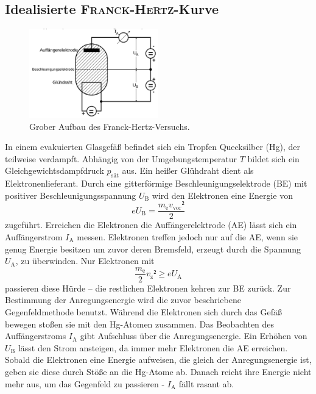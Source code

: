 \subsection{Idealisierte \textsc{Franck}-\textsc{Hertz}-Kurve}
\begin{figure}
	\centering
	\includegraphics[width=0.5\textwidth]{Bilder/Aufbau.pdf}
	\caption{Grober Aufbau des Franck-Hertz-Versuchs.}
\end{figure}
In einem evakuierten Glasgefäß befindet sich ein Tropfen Quecksilber (Hg), der teilweise verdampft. 
Abhängig von der Umgebungstemperatur $T$ bildet sich ein Gleichgewichtsdampfdruck $p_\mathup{sät}$ aus. 
Ein heißer Glühdraht dient als Elektronenlieferant.
Durch eine gitterförmige Beschleunigungselektrode (BE) mit positiver Beschleunigungsspannung $U_\mathup{B}$ wird den Elektronen eine Energie von 
\begin{equation}
	e U_\mathup{B}=\frac{m_\mathup{e}v_\mathup{vor}²}{2}
\end{equation}
zugeführt. 
Erreichen die Elektronen die Auffängerelektrode (AE) lässt sich ein Auffängerstrom $I_\mathup{A}$ messen. 
Elektronen treffen jedoch nur auf die AE, wenn sie genug Energie besitzen um zuvor deren Bremsfeld, erzeugt durch die Spannung $U_\mathup{A}$, zu überwinden. 
Nur Elektronen mit 
\begin{equation}
	\frac{m_\mathup{e}}{2}v_\mathup{z}² \geq e U_\mathup{A}
\end{equation}
passieren diese Hürde -- die restlichen Elektronen kehren zur BE zurück.
Zur Bestimmung der Anregungsenergie wird die zuvor beschriebene Gegenfeldmethode benutzt. 
Während die Elektronen sich durch das Gefäß bewegen stoßen sie mit den Hg-Atomen zusammen. 
Das Beobachten des Auffängerstroms $I_\mathup{A}$ gibt Aufschluss über die Anregungsenergie.
Ein Erhöhen von $U_\mathup{B}$ lässt den Strom ansteigen, da immer mehr Elektronen die AE erreichen.
Sobald die Elektronen eine Energie aufweisen, die gleich der Anregungsenergie ist, geben sie diese durch Stöße an die Hg-Atome ab. 
Danach reicht ihre Energie nicht mehr aus, um das Gegenfeld zu passieren - $I_\mathup{A}$ fällt rasant ab.
